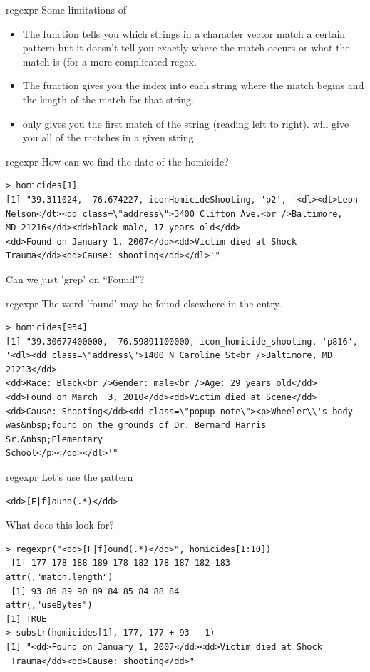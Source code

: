 \documentclass[aspectratio=169]{beamer}
\begin{document}
\begin{frame}[fragile]{regexpr}
Some limitations of 
\begin{itemize}
\item  The  function tells you which strings in a character
  vector match a certain pattern but it doesn't tell you exactly where
  the match occurs or what the match is (for a more complicated
  regex. 
\item The  function gives you the index into each string
  where the match begins and the length of the match for that string.
\item {} only gives you the first match of the string
  (reading left to right).  will give you all of the
  matches in a given string.
\end{itemize}
\end{frame}


\begin{frame}[fragile]{regexpr}
How can we find the date of the homicide?
\begin{verbatim}
> homicides[1]
[1] "39.311024, -76.674227, iconHomicideShooting, 'p2', '<dl><dt>Leon
Nelson</dt><dd class=\"address\">3400 Clifton Ave.<br />Baltimore, 
MD 21216</dd><dd>black male, 17 years old</dd>
<dd>Found on January 1, 2007</dd><dd>Victim died at Shock 
Trauma</dd><dd>Cause: shooting</dd></dl>'"
\end{verbatim}
Can we just 'grep' on ``Found''?
\end{frame}

\begin{frame}[fragile]{regexpr}
The word 'found' may be found elsewhere in the entry.
\begin{verbatim}
> homicides[954]
[1] "39.30677400000, -76.59891100000, icon_homicide_shooting, 'p816', 
'<dl><dd class=\"address\">1400 N Caroline St<br />Baltimore, MD 21213</dd>
<dd>Race: Black<br />Gender: male<br />Age: 29 years old</dd>
<dd>Found on March  3, 2010</dd><dd>Victim died at Scene</dd>
<dd>Cause: Shooting</dd><dd class=\"popup-note\"><p>Wheeler\\'s body 
was&nbsp;found on the grounds of Dr. Bernard Harris Sr.&nbsp;Elementary 
School</p></dd></dl>'"
\end{verbatim}
\end{frame}

\begin{frame}[fragile]{regexpr}
Let's use the pattern
\begin{verbatim}
<dd>[F|f]ound(.*)</dd>
\end{verbatim}
What does this look for?
\begin{verbatim}
> regexpr("<dd>[F|f]ound(.*)</dd>", homicides[1:10])
 [1] 177 178 188 189 178 182 178 187 182 183
attr(,"match.length")
 [1] 93 86 89 90 89 84 85 84 88 84
attr(,"useBytes")
[1] TRUE
> substr(homicides[1], 177, 177 + 93 - 1)
[1] "<dd>Found on January 1, 2007</dd><dd>Victim died at Shock
 Trauma</dd><dd>Cause: shooting</dd>"
\end{verbatim}
\end{frame}
\end{document}
